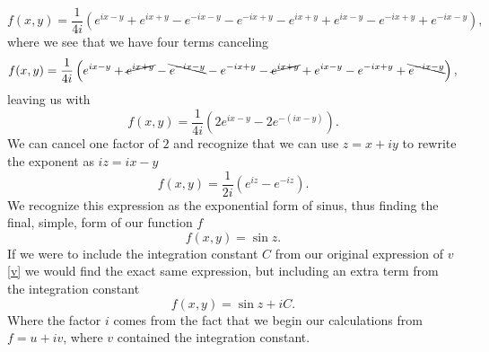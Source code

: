 \documentclass[12pt,twoside]{article}
\begin{document}
\begin{equation}
  f(x, y) = \frac{1}{4i}\left(e^{ix-y}+e^{ix+y}-e^{-ix-y}-e^{-ix+y} - e^{ix+y}+ e^{ix-y}-e^{-ix+y}+e^{-ix-y}\right),
\end{equation}
where we see that we have four terms canceling
\begin{equation}
  f(x, y) = \frac{1}{4i}\left(e^{ix-y}+\cancel{e^{ix+y}}-\bcancel{e^{-ix-y}}-e^{-ix+y} - \cancel{e^{ix+y}}+ e^{ix-y}-e^{-ix+y}+\bcancel{e^{-ix-y}}\right),
\end{equation}
leaving us with
\begin{equation}
  f(x, y) = \frac{1}{4i}\left(2e^{ix-y} - 2e^{-(ix-y)}\right).
\end{equation}
We can cancel one factor of $2$ and recognize that we can use $z=x+iy$ to rewrite the exponent as $iz=ix-y$
\begin{equation}
  f(x, y) = \frac{1}{2i}\left(e^{iz} - e^{-iz}\right).
\end{equation}
We recognize this expression as the exponential form of sinus, thus finding the final, simple, form of our function $f$
\begin{equation}
  f(x, y) = \sin{z}.
\end{equation}
If we were to include the integration constant $C$ from our original expression of $v$ \eqref{v} we would find the exact same expression, but including an extra term from the integration constant
\begin{equation}
  f(x, y) = \sin{z} + iC.
\end{equation}
Where the factor $i$ comes from the fact that we begin our calculations from $f=u+iv$, where $v$ contained the integration constant.
\end{document}
